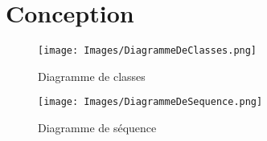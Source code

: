 \section{Conception}
\label{sec:Conception}
  \begin{figure}[h]
    \caption{Diagramme de classes}
    \centering
    \texttt{[image: Images/DiagrammeDeClasses.png]}
  \end{figure}

  \begin{figure}[h]
    \caption{Diagramme de séquence}
    \centering
    \texttt{[image: Images/DiagrammeDeSequence.png]}
  \end{figure}
\pagebreak

